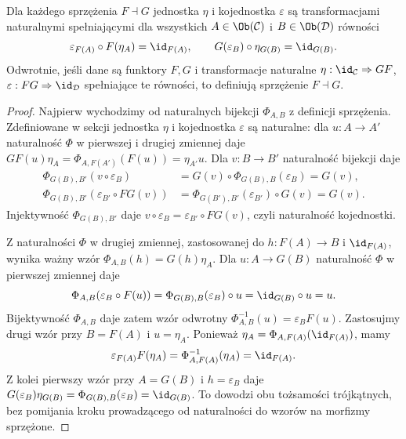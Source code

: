 \begin{twierdzenie}\label{tw:triangles}
Dla każdego sprzężenia $F\dashv G$ jednostka $\eta$ i kojednostka $\varepsilon$ są transformacjami naturalnymi spełniającymi dla wszystkich $A\in\Ob(\mathcal C)$ i $B\in\Ob(\mathcal D)$ równości
\[
\varepsilon_{F(A)}\circ F(\eta_A)=\id_{F(A)},\qquad G(\varepsilon_B)\circ\eta_{G(B)}=\id_{G(B)}.
\]
Odwrotnie, jeśli dane są funktory $F,G$ i transformacje naturalne $\eta:\id_{\mathcal C}\Rightarrow GF$, $\varepsilon:FG\Rightarrow\id_{\mathcal D}$ spełniające te równości, to definiują sprzężenie $F\dashv G$.
\end{twierdzenie}
\begin{proof}
Najpierw wychodzimy od naturalnych bijekcji $\Phi_{A,B}$ z definicji sprzężenia. Zdefiniowane w sekcji jednostka $\eta$ i kojednostka $\varepsilon$ są naturalne: dla $u:A\to A'$ naturalność $\Phi$ w pierwszej i drugiej zmiennej daje
$GF(u)\eta_A=\Phi_{A,F(A')}(F(u))=\eta_{A'}u$. Dla $v:B\to B'$ naturalność bijekcji daje
\[
\begin{aligned}
\Phi_{G(B),B'}(v\circ\varepsilon_B)
&=G(v)\circ\Phi_{G(B),B}(\varepsilon_B)=G(v),\\
\Phi_{G(B),B'}(\varepsilon_{B'}\circ FG(v))
&=\Phi_{G(B'),B'}(\varepsilon_{B'})\circ G(v)=G(v).
\end{aligned}
\]
Injektywność $\Phi_{G(B),B'}$ daje $v\circ\varepsilon_B=\varepsilon_{B'}\circ FG(v)$, czyli naturalność kojednostki.

Z naturalności $\Phi$ w drugiej zmiennej, zastosowanej do $h:F(A)\to B$ i $\id_{F(A)}$, wynika ważny wzór
$\Phi_{A,B}(h)=G(h)\eta_A$.
Dla $u:A\to G(B)$ naturalność $\Phi$ w pierwszej zmiennej daje
\[
\Phi_{A,B}(\varepsilon_B\circ F(u))
=\Phi_{G(B),B}(\varepsilon_B)\circ u=\id_{G(B)}\circ u=u.
\]
Bijektywność $\Phi_{A,B}$ daje zatem wzór odwrotny
$\Phi_{A,B}^{-1}(u)=\varepsilon_BF(u)$.
Zastosujmy drugi wzór przy $B=F(A)$ i $u=\eta_A$. Ponieważ $\eta_A=\Phi_{A,F(A)}(\id_{F(A)})$, mamy
\[
\varepsilon_{F(A)}F(\eta_A)
=\Phi_{A,F(A)}^{-1}(\eta_A)=\id_{F(A)}.
\]
Z kolei pierwszy wzór przy $A=G(B)$ i $h=\varepsilon_B$ daje
$G(\varepsilon_B)\eta_{G(B)}=\Phi_{G(B),B}(\varepsilon_B)=\id_{G(B)}$.
To dowodzi obu tożsamości trójkątnych, bez pomijania kroku prowadzącego od naturalności do wzorów na morfizmy sprzężone.


\end{proof}
